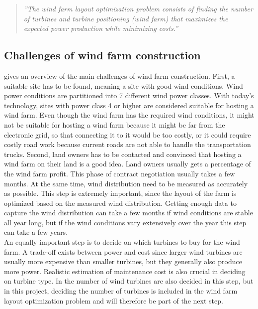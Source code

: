 \begin{quote}
\textit{''The wind farm layout optimization problem consists of finding the number of turbines and turbine positioning (wind farm) that maximizes the expected power production while minimizing costs.''}
\end{quote}


\subsection{Challenges of wind farm construction}
\cite{Samorani} gives an overview of the main challenges of wind farm construction. First, a suitable site has to be found, meaning a site with good wind conditions. Wind power conditions are partitioned into 7 different wind power classes. With today's technology, sites with power class 4 or higher are considered suitable for hosting a wind farm. Even though the wind farm has the required wind conditions, it might not be suitable for hosting a wind farm because it might be far from the electronic grid, so that connecting it to it would be too costly, or it could require costly road work because current roads are not able to handle the transportation trucks. Second, land owners has to be contacted and convinced that hosting a wind farm on their land is a good idea. Land owners usually gets a percentage of the wind farm profit. This phase of contract negotiation  usually takes a few months. At the same time, wind distribution need to be measured as accurately as possible. This step is extremely important, since the layout of the farm is optimized based on the measured wind distribution. Getting enough data to capture the wind distribution can take a few months if wind conditions are stable all year long, but if the wind conditions vary extensively over the year this step can take a few years. \\

\noindent An equally important step is to decide on which turbines to buy for the wind farm. A trade-off exists between power and cost since larger wind turbines are usually more expensive than smaller turbines, but they generally also produce more power. Realistic estimation of maintenance cost is also crucial in deciding on turbine type. In \cite{Samorani} the number of wind turbines are also decided in this step, but in this project, deciding the number of turbines is included in the wind farm layout optimization problem and will therefore be part of the next step. \\

